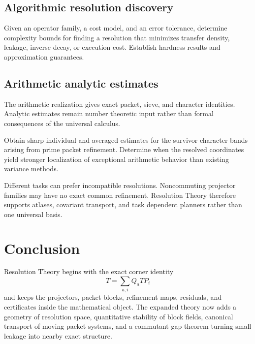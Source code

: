 \documentclass{aomart}
\theoremstyle{definition}
\theoremstyle{remark}
\begin{document}
\subsection{Algorithmic resolution discovery}

\begin{problem}\label{prob:discovery}
Given an operator family, a cost model, and an error tolerance, determine complexity bounds for finding a resolution that minimizes transfer density, leakage, inverse decay, or execution cost. Establish hardness results and approximation guarantees.
\end{problem}

\subsection{Arithmetic analytic estimates}

The arithmetic realization gives exact packet, sieve, and character identities. Analytic estimates remain number theoretic input rather than formal consequences of the universal calculus.

\begin{problem}\label{prob:arithmetic_estimates}
Obtain sharp individual and averaged estimates for the survivor character bands arising from prime packet refinement. Determine when the resolved coordinates yield stronger localization of exceptional arithmetic behavior than existing variance methods.
\end{problem}

\begin{remark}\label{rem:no_universal_chart}
Different tasks can prefer incompatible resolutions. Noncommuting projector families may have no exact common refinement. Resolution Theory therefore supports atlases, covariant transport, and task dependent planners rather than one universal basis.
\end{remark}

\section{Conclusion}\label{sec:conclusion}

Resolution Theory begins with the exact corner identity
\[
 T=\sum_{a,i}Q_aTP_i
\]
and keeps the projectors, packet blocks, refinement maps, residuals, and certificates inside the mathematical object. The expanded theory now adds a geometry of resolution space, quantitative stability of block fields, canonical transport of moving packet systems, and a commutant gap theorem turning small leakage into nearby exact structure.
\end{document}
